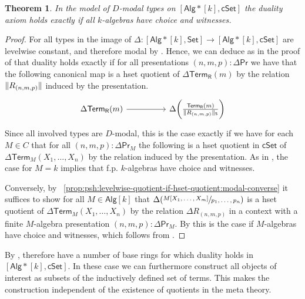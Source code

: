 \documentclass[10pt,a4paper]{article}
\newtheorem{theorem}{Theorem}[section]
\theoremstyle{definition}
\theoremstyle{remark}
\newcommand{\Set}{\mathsf{Set}}
\newcommand{\cSet}{\mathsf{cSet}}
\newcommand{\Alg}{\mathsf{Alg}}
\DeclarePairedDelimiter\paren{(}{)}
\newcommand\R{\mathsf{R}}
\renewcommand\Pr{\mathsf{Pr}}
\newcommand\Term{\mathsf{Term}}
\begin{document}
\begin{theorem}
  In the model of \(D\)-modal types on \([\Alg*[k], \cSet]\) the duality axiom holds exactly if all \(k\)-algebras have choice and witnesses.
\end{theorem}
\begin{proof}
  For all types in the image of \(\Delta \colon [\Alg*[k], \Set] \to [\Alg*[k], \cSet]\) are levelwise constant, and therefore modal by .
  Hence, we can deduce as in the proof of  that duality holds exactly if for all presentations \((n, m, p) \colon \Delta\Pr\) we have that the following canonical map is a hset quotient of \(\Delta \Term_\R(m)\) by the relation \(\trunc{R_{(n,m,p)}}\) induced by the presentation.
  \[\begin{tikzcd}
    {\Delta \Term_\R(m)} && {\Delta\paren[\bigg]{\frac{\Term_\R(m)}{\trunc*{R_{(n,m,p)}}}}}
    \arrow[from=1-1, to=1-3]
  \end{tikzcd}\]
  Since all involved types are \(D\)-modal, this is the case exactly if we have for each \(M \in C\) that for all \((n, m, p) \colon \Delta \Pr_M\) the following is a hset quotient in \(\cSet\) of \(\Delta\Term_M(X_1, \ldots, X_n)\) by the relation induced by the presentation.
  As in , the case for \(M = k\) implies that f.p. \(k\)-algebras have choice and witnesses.
  
  Conversely, by ~\ref{prop:psh:levelwise-quotient-if-hset-quotient:modal-converse} it suffices to show for all \(M \in \Alg[k]\) that \(\Delta \paren{\sfrac{M[X_1, \ldots, X_m]}{p_1, \ldots, p_n}}\) is a hset quotient of \(\Delta\Term_{M}(X_1, \ldots, X_n)\) by the relation \(\Delta R_{(n,m,p)}\) in a context with a finite \(M\)-algebra presentation \((n,m,p) \colon \Delta \Pr_M\).
  By  this is the case if \(M\)-algebras have choice and witnesses, which follows from .
\end{proof}

By , therefore have a number of base rings for which duality holds in \([\Alg*[k], \cSet]\).
In these case we can furthermore construct all objects of interest as subsets of the inductively defined set of terms.
This makes the construction independent of the existence of quotients in the meta theory.
\end{document}
